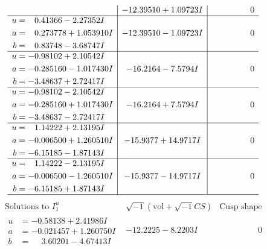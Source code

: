 \documentclass[1p]{elsarticle_modified}
\theoremstyle{definition}
\newcommand{\I}{\sqrt{-1}}
\begin{document}
$$\begin{array}{c|c|c}
 & -12.39510 + 1.09723 I & \phantom{-0.000000 } 0 \\ \hline\begin{aligned}
u &= \phantom{-}0.41366 - 2.27352 I \\
a &= \phantom{-}0.273778 + 1.053910 I \\
b &= \phantom{-}0.83748 - 3.68747 I\end{aligned}
 & -12.39510 - 1.09723 I & \phantom{-0.000000 } 0 \\ \hline\begin{aligned}
u &= -0.98102 + 2.10542 I \\
a &= -0.285160 - 1.017430 I \\
b &= -3.48637 + 2.72417 I\end{aligned}
 & -16.2164 - 7.5794 I & \phantom{-0.000000 } 0 \\ \hline\begin{aligned}
u &= -0.98102 - 2.10542 I \\
a &= -0.285160 + 1.017430 I \\
b &= -3.48637 - 2.72417 I\end{aligned}
 & -16.2164 + 7.5794 I & \phantom{-0.000000 } 0 \\ \hline\begin{aligned}
u &= \phantom{-}1.14222 + 2.13195 I \\
a &= -0.006500 + 1.260510 I \\
b &= -6.15185 - 1.87143 I\end{aligned}
 & -15.9377 + 14.9717 I & \phantom{-0.000000 } 0 \\ \hline\begin{aligned}
u &= \phantom{-}1.14222 - 2.13195 I \\
a &= -0.006500 - 1.260510 I \\
b &= -6.15185 + 1.87143 I\end{aligned}
 & -15.9377 - 14.9717 I & \phantom{-0.000000 } 0\\
 \hline 
 \end{array}$$\newpage$$\begin{array}{c|c|c}  
\text{Solutions to }I^u_{1}& \I (\text{vol} + \sqrt{-1}CS) & \text{Cusp shape}\\
 \hline 
\begin{aligned}
u &= -0.58138 + 2.41986 I \\
a &= -0.021457 + 1.260750 I \\
b &= \phantom{-}3.60201 - 4.67413 I\end{aligned}
 & -12.2225 - 8.2203 I & \phantom{-0.000000 } 0 \\ \hline\begin{aligned}

\end{aligned}
\end{array}$$
\end{document}
